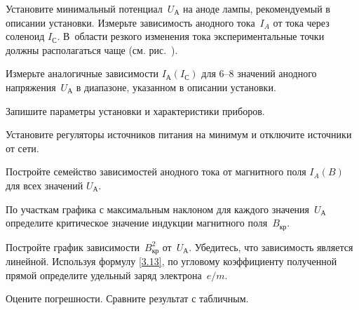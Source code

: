 \begin{lab:task}


    
\item Установите минимальный потенциал~$U_{А}$ на аноде лампы, 
рекомендуемый в описании установки. Измерьте зависимость анодного тока~$I_A$ 
от тока через соленоид $I_{С}$. В~области резкого изменения тока
экспериментальные точки должны располагаться чаще 
(см. рис.~).

\item Измерьте аналогичные зависимости $I_{А}(I_{С})$ для 6--8 
значений анодного напряжения~$U_{А}$ в диапазоне, указанном в описании установки.

\item Запишите параметры установки и характеристики приборов. 

\item Установите регуляторы источников питания на минимум и отключите
источники от сети.


\item Постройте семейство зависимостей анодного тока от магнитного поля $I_{A}(B)$ 
для всех значений $U_{А}$. 

\item По участкам графика с максимальным наклоном для каждого значения~$U_{А}$ 
определите критическое значение индукции магнитного поля~$B_\text{кр}$.

\item Постройте  график зависимости~$B_\text{кр}^2$ от~$U_{А}$. 
Убедитесь, что зависимость является линейной. Используя
формулу \eqref{3.13}, по угловому коэффициенту полученной 
прямой определите удельный заряд электрона~$e/m$.

\item Оцените погрешности. Сравните результат с табличным.

\end{lab:task}


